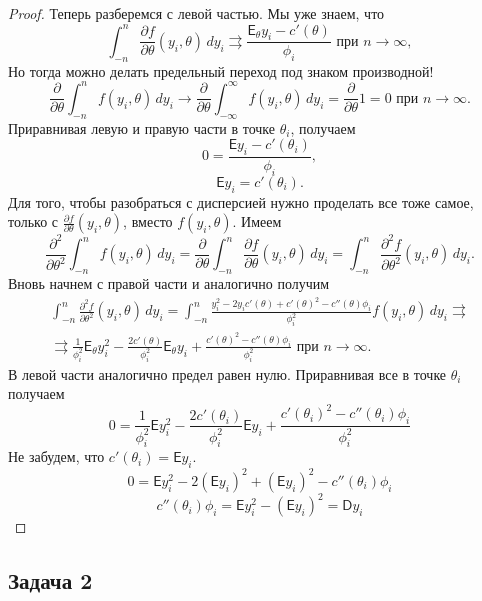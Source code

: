 \begin{proof}
  Теперь разберемся с левой частью. Мы уже знаем, что
  $$
  \int_{-n}^n\frac{\partial f}{\partial\theta}(y_i,\theta)\,dy_i \rightrightarrows \frac{\mathsf{E}_\theta y_i - c'(\theta)}{\phi_i} \text{ при } n\to\infty,
  $$
  Но тогда можно делать предельный переход под знаком производной!
  $$
  \frac{\partial}{\partial\theta} \int_{-n}^n f(y_i, \theta)\,dy_i \to \frac{\partial}{\partial\theta} \int_{-\infty}^\infty f(y_i, \theta)\,dy_i = \frac{\partial}{\partial\theta} 1 = 0 \text{ при } n\to\infty.
  $$
  Приравнивая левую и правую части в точке $\theta_i$, получаем
  $$
  0 = \frac{\mathsf{E}y_i - c'(\theta_i)}{\phi_i},
  $$
  $$
  \mathsf{E}y_i = c'(\theta_i).
  $$
  Для того, чтобы разобраться с дисперсией нужно проделать все тоже самое, только с $\frac{\partial f}{\partial\theta}(y_i, \theta)$, вместо $f(y_i, \theta)$. Имеем
  $$
  \frac{\partial^2}{\partial\theta^2} \int_{-n}^n f(y_i, \theta)\,dy_i =
  \frac{\partial}{\partial\theta} \int_{-n}^n\frac{\partial f}{\partial\theta}(y_i,\theta)\,dy_i = \int_{-n}^n\frac{\partial^2 f}{\partial\theta^2}(y_i,\theta)\,dy_i.
  $$
  Вновь начнем с правой части и аналогично получим
  \begin{multline*}
    \int_{-n}^n\frac{\partial^2 f}{\partial\theta^2}(y_i,\theta)\,dy_i =
    \int_{-n}^n \frac{y_i^2 - 2y_ic'(\theta) + c'(\theta)^2 - c''(\theta)\phi_i}{\phi_i^2} f(y_i,\theta)\,dy_i \rightrightarrows\\
    \rightrightarrows
    \frac{1}{\phi_i^2}\mathsf{E}_\theta y_i^2 -
    \frac{2c'(\theta)}{\phi_i^2}\mathsf{E}_\theta y_i +
    \frac{c'(\theta)^2 - c''(\theta)\phi_i}{\phi_i^2} \text{ при } n\to\infty.
  \end{multline*}
  В левой части аналогично предел равен нулю. Приравнивая все в точке $\theta_i$ получаем
  $$
  0 = \frac{1}{\phi_i^2}\mathsf{E} y_i^2 -
  \frac{2c'(\theta_i)}{\phi_i^2}\mathsf{E} y_i +
  \frac{c'(\theta_i)^2 - c''(\theta_i)\phi_i}{\phi_i^2}
  $$
  Не забудем, что $c'(\theta_i) = \mathsf{E} y_i$.
  $$
  0 = \mathsf{E} y_i^2 - 2\left(\mathsf{E} y_i\right)^2 + \left(\mathsf{E} y_i\right)^2 - c''(\theta_i)\phi_i
  $$
  $$
  c''(\theta_i)\phi_i = \mathsf{E} y_i^2 - \left(\mathsf{E} y_i\right)^2 = \mathsf{D}y_i
  $$
\end{proof}

\subsection*{Задача 2}

